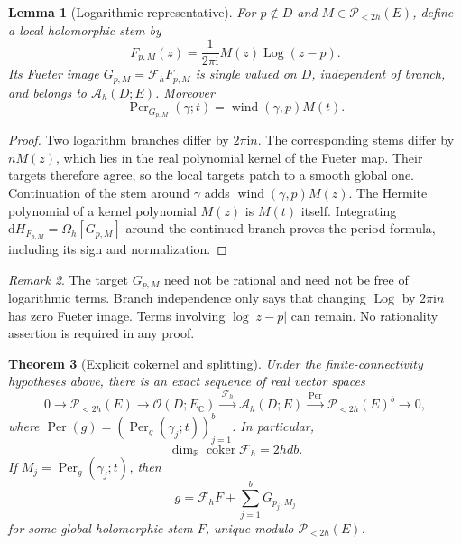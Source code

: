 \documentclass[11pt,a4paper]{article}
\numberwithin{equation}{section}
\newtheorem{theorem}{Theorem}[section]
\newtheorem{lemma}[theorem]{Lemma}
\theoremstyle{definition}
\theoremstyle{remark}
\newtheorem{remark}[theorem]{Remark}
\newcommand{\R}{\mathbb R}
\newcommand{\C}{\mathbb C}
\newcommand{\ii}{\mathrm i}
\newcommand{\Hol}{\mathcal O}
\newcommand{\AM}{\mathcal A_h}
\newcommand{\Fu}{\mathcal F_h}
\newcommand{\PP}{\mathscr P_{<2h}(E)}
\newcommand{\Om}{\Omega_h}
\newcommand{\Per}{\operatorname{Per}}
\begin{document}
\begin{lemma}[Logarithmic representative]\label{lem:log-representative}
For $p\notin D$ and $M\in\PP$, define a local holomorphic stem by
\begin{equation}\label{eq:log-stem}
 F_{p,M}(z)=\frac{1}{2\pi\ii}M(z)\operatorname{Log}(z-p).
\end{equation}
Its Fueter image $G_{p,M}=\Fu F_{p,M}$ is single valued on $D$, independent
of branch, and belongs to $\AM(D;E)$. Moreover
\begin{equation}\label{eq:log-period}
 \Per_{G_{p,M}}(\gamma;t)=\operatorname{wind}(\gamma,p)M(t).
\end{equation}
\end{lemma}

\begin{proof}
Two logarithm branches differ by $2\pi\ii n$. The corresponding stems differ
by $nM(z)$, which lies in the real polynomial kernel of the Fueter map.
Their targets therefore agree, so the local targets patch to a smooth global
one. Continuation of the stem around $\gamma$ adds
$\operatorname{wind}(\gamma,p)M(z)$. The Hermite polynomial of a kernel
polynomial $M(z)$ is $M(t)$ itself. Integrating
$\mathrm dH_{F_{p,M}}=\Om[G_{p,M}]$ around the continued branch proves the
period formula, including its sign and normalization.
\end{proof}

\begin{remark}
The target $G_{p,M}$ need not be rational and need not be free of logarithmic
terms. Branch independence only says that changing $\operatorname{Log}$ by
$2\pi\ii n$ has zero Fueter image. Terms involving $\log|z-p|$ can remain.
No rationality assertion is required in any proof.
\end{remark}

\begin{theorem}[Explicit cokernel and splitting]\label{thm:cokernel}
Under the finite-connectivity hypotheses above, there is an exact sequence of
real vector spaces
\begin{equation}\label{eq:exact-sequence}
 0\longrightarrow\PP\longrightarrow\Hol(D;E_{\C})
 \xrightarrow{\ \Fu\ }\AM(D;E)
 \xrightarrow{\ \Per\ }\PP^b\longrightarrow0,
\end{equation}
where $\Per(g)=(\Per_g(\gamma_j;t))_{j=1}^b$. In particular,
\begin{equation}\label{eq:cokernel-dimension}
 \dim_{\R}\operatorname{coker}\Fu=2hdb.
\end{equation}
If $M_j=\Per_g(\gamma_j;t)$, then
\begin{equation}\label{eq:decomposition}
 g=\Fu F+\sum_{j=1}^bG_{p_j,M_j}
\end{equation}
for some global holomorphic stem $F$, unique modulo $\PP$.
\end{theorem}
\end{document}
